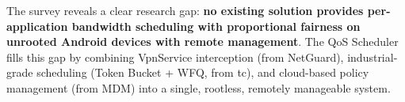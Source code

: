 The survey reveals a clear research gap: \textbf{no existing solution provides per-application bandwidth scheduling with proportional fairness on unrooted Android devices with remote management}. The QoS Scheduler fills this gap by combining VpnService interception (from NetGuard), industrial-grade scheduling (Token Bucket + WFQ, from tc), and cloud-based policy management (from MDM) into a single, rootless, remotely manageable system.

